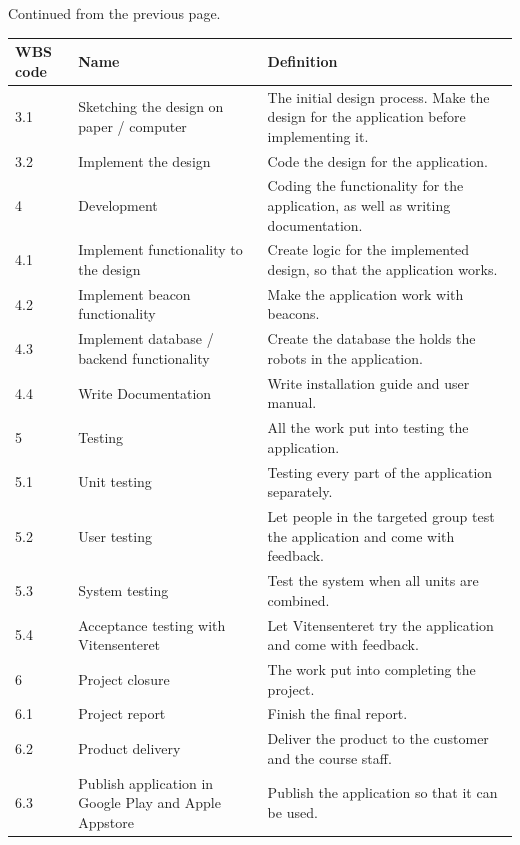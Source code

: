 \begin{center}
\begin{table}[H]
Continued from the previous page.\\
\begin{tabular}{| m{2cm} | m{5cm} | m{5cm} |}
\hline
\textbf {WBS code} & \textbf {Name} & \textbf{Definition} \\
    \hline
    3.1 & Sketching the design on paper / computer & The initial design process. Make the design for the application before implementing it. \\
    \hline
    3.2 & Implement the design & Code the design for the application. \\
    \hline
    4 & Development & Coding the functionality for the application, as well as writing documentation. \\
    \hline
    4.1 & Implement functionality to the design & Create logic for the implemented design, so that the application works. \\
    \hline
    4.2 & Implement beacon functionality & Make the application work with beacons. \\
    \hline
    4.3 & Implement database / backend functionality & Create the database the holds the robots in the application. \\
    \hline
    4.4 & Write Documentation & Write installation guide and user manual. \\
    \hline
    5 & Testing & All the work put into testing the application. \\
    \hline
    5.1 & Unit testing & Testing every part of the application separately. \\
    \hline
    5.2 & User testing & Let people in the targeted group test the application and come with feedback.\\
    \hline
    5.3 & System testing & Test the system when all units are combined. \\
    \hline
    5.4 & Acceptance testing with Vitensenteret & Let Vitensenteret try the application and come with feedback.\\
    \hline
    6 & Project closure & The work put into completing the project. \\
    \hline
    6.1 & Project report & Finish the final report. \\
    \hline
    6.2 & Product delivery & Deliver the product to the customer and the course staff. \\
    \hline
    6.3 & Publish application in Google Play and Apple Appstore & Publish the application so that it can be used. \\
    \hline
\end{tabular}
\end{table}
\end{center}

